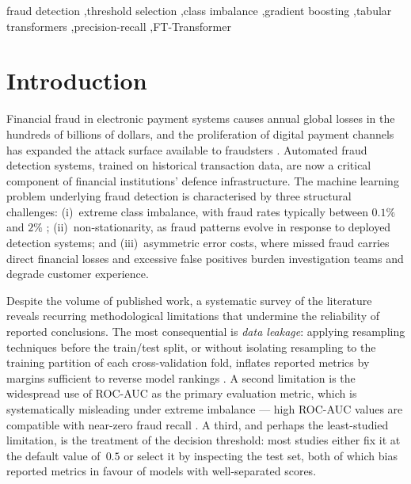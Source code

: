 \documentclass[a4paper,fleqn]{cas-sc}
\begin{document}

\begin{keywords}
  fraud detection \sep threshold selection \sep class imbalance \sep gradient boosting
  \sep tabular transformers \sep precision-recall \sep FT-Transformer
\end{keywords}

\maketitle

\section{Introduction}
\label{sec:intro}

Financial fraud in electronic payment systems causes annual global losses in the
hundreds of billions of dollars, and the proliferation of digital payment channels
has expanded the attack surface available to fraudsters \citep{rymantubb2018survey}.
Automated fraud detection systems, trained on historical transaction data, are now a
critical component of financial institutions' defence infrastructure.
The machine learning problem underlying fraud detection is characterised by three
structural challenges: (i)~extreme class imbalance, with fraud rates typically between
$0.1\%$ and $2\%$ \citep{hegarcia2009learning}; (ii)~non-stationarity, as fraud patterns
evolve in response to deployed detection systems; and (iii)~asymmetric error costs,
where missed fraud carries direct financial losses and excessive false positives burden
investigation teams and degrade customer experience.

Despite the volume of published work, a systematic survey of the literature reveals
recurring methodological limitations that undermine the reliability of reported conclusions.
The most consequential is \emph{data leakage}: applying resampling techniques before
the train/test split, or without isolating resampling to the training partition of each
cross-validation fold, inflates reported metrics by margins sufficient to reverse model
rankings \citep{hayat2025leakage}.
A second limitation is the widespread use of ROC-AUC as the primary evaluation metric,
which is systematically misleading under extreme imbalance --- high ROC-AUC values are
compatible with near-zero fraud recall \citep{saito2015precision}.
A third, and perhaps the least-studied limitation, is the treatment of the decision
threshold: most studies either fix it at the default value of~$0.5$ or select it by
inspecting the test set, both of which bias reported metrics in favour of models with
well-separated scores.
\end{document}
